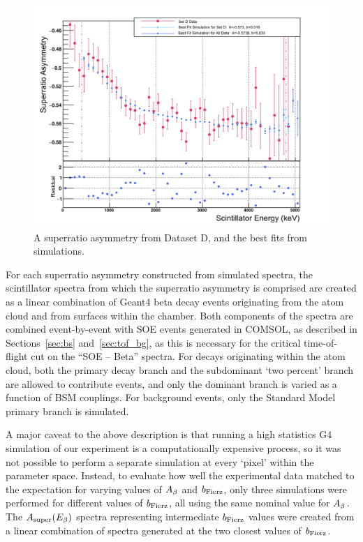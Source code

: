 \begin{figure}[h!t!b!]
	\centering
	\includegraphics[width=.999\linewidth]
	{Figures/BestAsymmetry_SetD.png}
	\caption[SetD Superratio Asymmetry]{A superratio asymmetry from Dataset D, and the best fits from simulations.}	
	\label{fig:asymmetryD}
\end{figure}
%

For each superratio asymmetry constructed from simulated spectra, the scintillator spectra from which the superratio asymmetry is comprised are created as a linear combination of Geant4 beta decay events originating from the atom cloud and from surfaces within the chamber.  Both components of the spectra are combined event-by-event with SOE events generated in COMSOL, as described in Sections~\ref{sec:bs} and~\ref{sec:tof_bg}, as this is necessary for the critical time-of-flight cut on the ``SOE -- Beta'' spectra.  For decays originating within the atom cloud, both the primary decay branch and the subdominant `two percent' branch are allowed to contribute events, and only the dominant branch is varied as a function of BSM couplings.  For background events, only the Standard Model primary branch is simulated.  

A major caveat to the above description is that running a high statistics G4 simulation of our experiment is a computationally expensive process, so it was not possible to perform a separate simulation at every `pixel' within the parameter space.  Instead, to evaluate how well the experimental data matched to the expectation for varying values of $A_{\beta}$ and $b_{\mathrm{Fierz}}$, only three simulations were performed for different values of $b_{\mathrm{Fierz}}$, all using the same nominal value for $A_{\beta}$.  The $A_{\mathrm{super}}(E_{\beta})$ spectra representing intermediate $b_{\mathrm{Fierz}}$ values were created from a linear combination of spectra generated at the two closest values of $b_{\mathrm{Fierz}}$.

